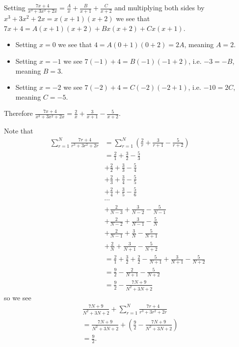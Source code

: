 \begin{questions}
    \item \begin{partquestions}{\roman*}
        \item Setting $\frac{7x+4}{x^3+3x^2+2x} = \frac{A}{x} + \frac{B}{x+1} + \frac{C}{x+2}$ and multiplying both sides by $x^3+3x^2+2x = x(x+1)(x+2)$ we see that $7x+4 = A(x+1)(x+2) + Bx(x+2) + Cx(x+1)$.
        \begin{itemize}
            \item Setting $x = 0$ we see that $4 = A(0+1)(0+2) = 2A$, meaning $A = 2$.
            \item Setting $x = -1$ we see $7(-1) + 4 = B(-1)(-1+2)$, i.e. $-3 = -B$, meaning $B = 3$.
            \item Setting $x = -2$ we see $7(-2) + 4 = C(-2)(-2+1)$, i.e. $-10 = 2C$, meaning $C = -5$.
        \end{itemize}
        Therefore $\frac{7x+4}{x^3+3x^2+2x} = \frac{2}{x} + \frac{3}{x+1} - \frac{5}{x+2}$.
        
        \newpage
        
        \item Note that
        \begin{align*}
            \sum_{r=1}^N \frac{7r+4}{r^3+3r^2+2r} &= \sum_{r=1}^N \left(\frac{2}{r} + \frac{3}{r+1} - \frac{5}{r+2}\right)\\
            &= \frac21 + \frac32 - \frac53\\
            &+ \frac22 + \frac33 - \frac54\\
            &+ \frac23 + \frac34 - \frac55\\
            &+ \frac24 + \frac35 - \frac56\\
            &\cdots\\
            &+ \frac2{N-3} + \frac{3}{N-2} - \frac{5}{N-1}\\
            &+ \frac2{N-2} + \frac{3}{N-1} - \frac{5}{N}\\
            &+ \frac2{N-1} + \frac{3}{N} - \frac{5}{N+1}\\
            &+ \frac2{N} + \frac{3}{N+1} - \frac{5}{N+2}\\
            &= \frac21 + \frac32 + \frac22 - \frac{5}{N+1} + \frac{3}{N+1} - \frac{5}{N+2}\\
            &= \frac92 - \frac{2}{N+1} - \frac{5}{N+2}\\
            &= \frac92 - \frac{7N+9}{N^2+3N+2}
        \end{align*}
        so we see
        \begin{align*}
            &\frac{7N+9}{N^2+3N+2} + \sum_{r=1}^N \frac{7r+4}{r^3+3r^2+2r}\\
            &= \frac{7N+9}{N^2+3N+2} + \left(\frac92 - \frac{7N+9}{N^2+3N+2}\right)\\
            &= \frac92.
        \end{align*}
    \end{partquestions}


\end{questions}
